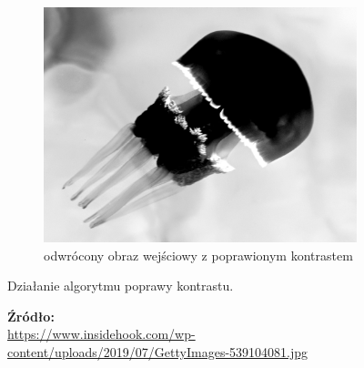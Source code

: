 \begin{figure}[htb]
\begin{subfigure}{0.31\textwidth}
            \label{theory-technics-contrast-jellyfish-b}
        \end{subfigure}
        \begin{subfigure}{0.31\textwidth}
            \centering
            \includegraphics[width = \textwidth]{img/2-theory/20-inv-jellyfish.png}
            \caption{odwrócony obraz wejściowy z poprawionym kontrastem}
            \label{theory-technics-contrast-jellyfish-c}
        \end{subfigure}
        \caption{Działanie algorytmu poprawy kontrastu.}
        \caption*{\footnotesize{\textbf{Źródło:}\\
        \url{https://www.insidehook.com/wp-content/uploads/2019/07/GettyImages-539104081.jpg}}}
        \label{theory-technics-contrast-jellyfish}
        \end{figure}
    
